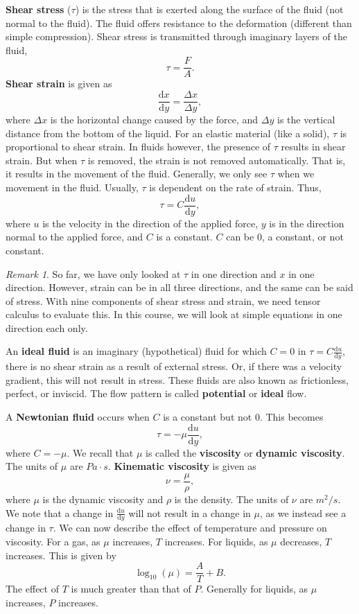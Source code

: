 \documentclass[11pt]{article}
\theoremstyle{plain} %
\theoremstyle{definition}
\theoremstyle{example}
\theoremstyle{remark}
\newtheorem*{remark}{Remark}
\begin{document}
\textbf{Shear stress} ($\tau$) is the stress that is exerted along the surface of the fluid (not normal to the fluid). The fluid offers resistance to the deformation (different than simple compression). Shear stress is transmitted through imaginary layers of the fluid, 
$$\tau = \frac{F}{A}.$$
\textbf{Shear strain} is given as 
$$\frac{\mathrm d x}{\mathrm d y} = \frac{\Delta x}{\Delta y},$$
where $\Delta x$ is the horizontal change caused by the force, and $\Delta y$ is the vertical distance from the bottom of the liquid. For an elastic material (like a solid), $\tau$ is proportional to shear strain. In fluids however, the presence of $\tau$ results in shear strain. But when $\tau$ is removed, the strain is not removed automatically. That is, it results in the movement of the fluid. Generally, we only see $\tau$ when we movement in the fluid. Usually, $\tau$ is dependent on the rate of strain. Thus, 
$$\tau = C\frac{\mathrm d u}{\mathrm d y},$$
where $u$ is the velocity in the direction of the applied force, $y$ is in the direction normal to the applied force, and $C$ is a constant. $C$ can be $0$, a constant, or not constant. 

\begin{remark}So far, we have only looked at $\tau$ in one direction and $x$ in one direction. However, strain can be in all three directions, and the same can be said of stress. With nine components of shear stress and strain, we need tensor calculus to evaluate this. In this course, we will look at simple equations in one direction each only. 
\end{remark}

An \textbf{ideal fluid} is an imaginary (hypothetical) fluid for which $C=0$ in $\tau = C\frac{\mathrm d u}{\mathrm d y}$, there is no shear strain as a result of external stress. Or, if there was a velocity gradient, this will not result in stress. These fluids are also known as frictionless, perfect, or inviscid. The flow pattern is called \textbf{potential} or \textbf{ideal} flow. 
	
A \textbf{Newtonian fluid} occurs when $C$ is a constant but not $0$. This becomes 
$$\tau = -\mu\frac{\mathrm d u}{\mathrm d y},$$
where $C = -\mu$. We recall that $\mu$ is called the \textbf{viscosity} or \textbf{dynamic viscosity}. The units of $\mu$ are $Pa\cdot s$. \textbf{Kinematic viscosity} is given as 
$$\nu = \frac{\mu}{\rho},$$
where $\mu$ is the dynamic viscosity and $\rho$ is the density. The units of $\nu$ are $m^2/s$. We note that a change in $\frac{\mathrm d u}{\mathrm d y}$ will not result in a change in $\mu$, as we instead see a change in $\tau$. We can now describe the effect of temperature and pressure on viscosity. For a gas, as $\mu$ increases, $T$ increases. For liquids, as $\mu$ decreases, $T$ increases. This is given by 
$$\log_{10}(\mu) = \frac{A}{T} + B.$$
The effect of $T$ is much greater than that of $P$. Generally for liquids, as $\mu$ increases, $P$ increases. 
\end{document}
